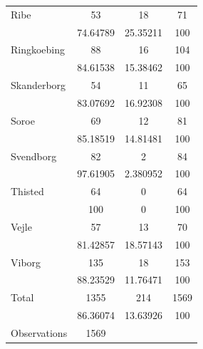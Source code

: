 {\begin{tabular}{l*{3}{c}}
Ribe                &          53&          18&          71\\
                    &    74.64789&    25.35211&         100\\
Ringkoebing         &          88&          16&         104\\
                    &    84.61538&    15.38462&         100\\
Skanderborg         &          54&          11&          65\\
                    &    83.07692&    16.92308&         100\\
Soroe               &          69&          12&          81\\
                    &    85.18519&    14.81481&         100\\
Svendborg           &          82&           2&          84\\
                    &    97.61905&    2.380952&         100\\
Thisted             &          64&           0&          64\\
                    &         100&           0&         100\\
Vejle               &          57&          13&          70\\
                    &    81.42857&    18.57143&         100\\
Viborg              &         135&          18&         153\\
                    &    88.23529&    11.76471&         100\\
Total               &        1355&         214&        1569\\
                    &    86.36074&    13.63926&         100\\
\midrule
Observations        &        1569&            &            \\
\bottomrule
\end{tabular}
}
